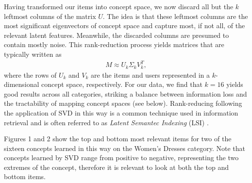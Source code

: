 \documentclass[11pt]{article}
\begin{document}
Having transformed our items into concept space, we now discard all but the $k$
leftmost columns of the matrix $U$. The idea is that these leftmost columns are
the most significant eigenvectors of concept space and capture most, if not all,
of the relevant latent features. Meanwhile, the discarded columns are presumed
to contain mostly noise. This rank-reduction process yields matrices that are
typically written as
\begin{align}
M \approx U_k \Sigma_k V^T_k,
\end{align}
where the rows of $U_k$ and $V_k$ are the items and users represented in a
$k$-dimensional concept space, respectively. For our data, we find that $k=16$
yields good results across all categories, striking a balance between
information loss and the tractability of mapping concept spaces (see below).
Rank-reducing following the application of SVD in this way is a common technique
used in information retrieval and is often referred to as {\em Latent Semantec
Indexing} (LSI) \cite{Deerwester1990}.

Figures 1 and 2 show the top and bottom most relevant items for two of the sixteen
concepts learned in this way on the Women's Dresses category. Note that concepts
learned by SVD range from positive to negative, representing the two extremes of
the concept, therefore it is relevant to look at both the top and bottom items.
\end{document}
